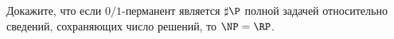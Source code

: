 Докажите, что если $0 / 1$-перманент является $\sharp \P$ полной задачей относительно сведений, сохраняющих число решений, то
$\NP = \RP$.
